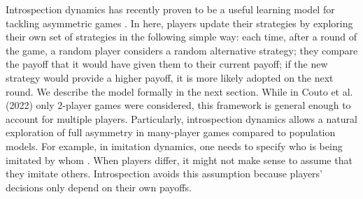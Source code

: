 \documentclass[11pt]{article}
\theoremstyle{plainCl1}
\theoremstyle{plainCl2}
\begin{document}


\noindent Introspection dynamics has recently proven to be a useful learning model for tackling asymmetric games \cite{Couto:NJP:2022, Hauser:Nature:2019, McAvoy:PNASnexus:2022, Schmid:PlosCB:2022}. In here, players update their strategies by exploring their own set of strategies in the following simple way: each time, after a round of the game, a random player considers a random alternative strategy; they compare the payoff that it would have given them to their current payoff; if the new strategy would provide a higher payoff, it is more likely adopted on the next round. We describe the model formally in the next section. 
While in Couto et al. (2022) \cite{Couto:NJP:2022} only 2-player games were considered, this framework is general enough to account for multiple players.  Particularly, introspection dynamics allows a natural exploration of full asymmetry in many-player games compared to population models. For example, in imitation dynamics, one needs to specify who is being imitated by whom \cite{Vasconcelos:PNAS:2014}. When players differ, it might not make sense to assume that they imitate others. Introspection avoids this assumption because players' decisions only depend on their own payoffs.
\end{document}

